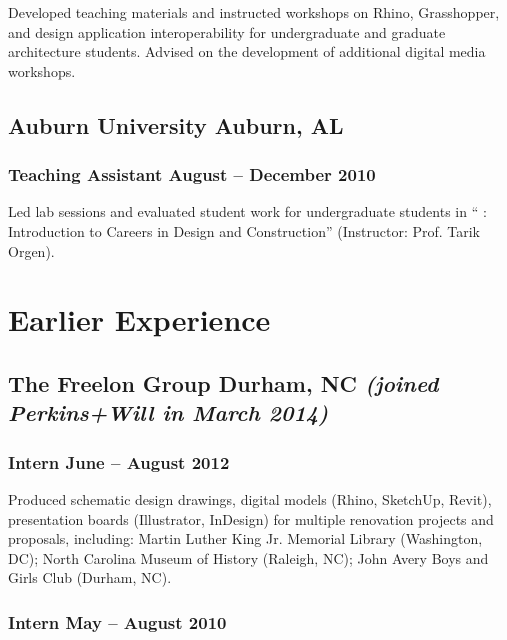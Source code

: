 \documentclass[letterpaper, oneside, 10pt]{article}
\begin{document}
Developed teaching materials and instructed workshops on Rhino, Grasshopper,
and design application interoperability for undergraduate and graduate
architecture students. Advised on the development of additional digital media
workshops.

\subsection*{Auburn University\DotSep{0.25em} Auburn, AL}

\subsubsection*{Teaching Assistant\DotSep{0.25em} August -- December 2010}

Led lab sessions and evaluated student work for undergraduate students in
`` : Introduction to Careers in Design and Construction''
(Instructor: Prof. Tarik Orgen).


\section*{Earlier Experience} %

\AdjSectSpace
\suppressfalse

\subsection*{%
  The Freelon Group\DotSep{0.25em} Durham, NC\DotSep{0.25em}%
  \space\textit{(joined Perkins+Will in March 2014)}%
}

\subsubsection*{Intern\DotSep{0.25em} June -- August 2012}

Produced schematic design drawings, digital models (Rhino, SketchUp, Revit),
presentation boards (Illustrator, InDesign) for multiple renovation projects
and proposals, including: Martin Luther King Jr. Memorial Library (Washington,
DC); North Carolina Museum of History (Raleigh, NC); John Avery Boys and Girls
Club (Durham, NC).


\subsubsection*{Intern\DotSep{0.25em} May -- August 2010}
\end{document}
